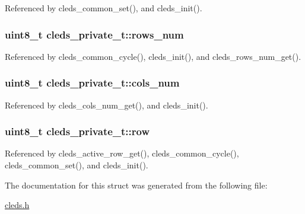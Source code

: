 Referenced by cleds\_\-common\_\-set(), and cleds\_\-init().\hypertarget{structcleds__private__t_bfe43e6502ca632e188110cdc24e6a33}{
\subsubsection{\setlength{\rightskip}{0pt plus 5cm}uint8\_\-t {\bf cleds\_\-private\_\-t::rows\_\-num}}}
\label{structcleds__private__t_bfe43e6502ca632e188110cdc24e6a33}




Referenced by cleds\_\-common\_\-cycle(), cleds\_\-init(), and cleds\_\-rows\_\-num\_\-get().\hypertarget{structcleds__private__t_18e08b5ce87a72396d14bed8ac3d0935}{
\subsubsection{\setlength{\rightskip}{0pt plus 5cm}uint8\_\-t {\bf cleds\_\-private\_\-t::cols\_\-num}}}
\label{structcleds__private__t_18e08b5ce87a72396d14bed8ac3d0935}




Referenced by cleds\_\-cols\_\-num\_\-get(), and cleds\_\-init().\hypertarget{structcleds__private__t_6317f0ab1470dd13501cf2f3a6a72499}{
\subsubsection{\setlength{\rightskip}{0pt plus 5cm}uint8\_\-t {\bf cleds\_\-private\_\-t::row}}}
\label{structcleds__private__t_6317f0ab1470dd13501cf2f3a6a72499}




Referenced by cleds\_\-active\_\-row\_\-get(), cleds\_\-common\_\-cycle(), cleds\_\-common\_\-set(), and cleds\_\-init().

The documentation for this struct was generated from the following file:\begin{CompactItemize}
\item 
\hyperlink{cleds_8h}{cleds.h}\end{CompactItemize}
